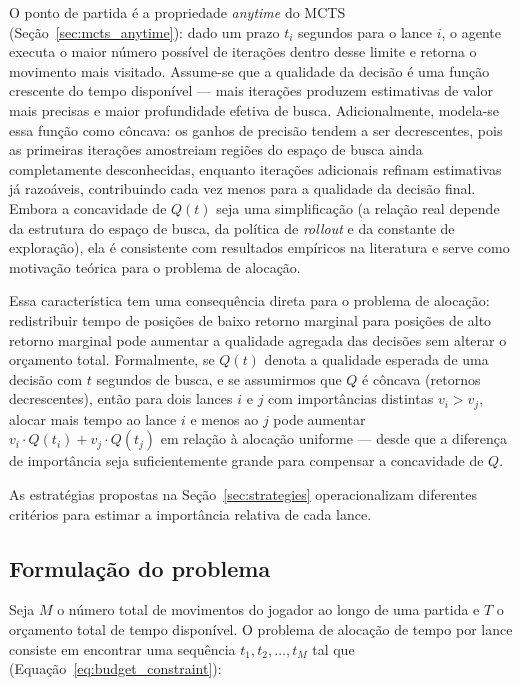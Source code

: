 \documentclass[cic,tc]{iiufrgs}
\begin{document}
O ponto de partida é a propriedade \emph{anytime} do MCTS (Seção~\ref{sec:mcts_anytime}): dado um prazo $t_i$ segundos para o lance $i$, o agente executa o maior número possível de iterações dentro desse limite e retorna o movimento mais visitado. Assume-se que a qualidade da decisão é uma função crescente do tempo disponível — mais iterações produzem estimativas de valor mais precisas e maior profundidade efetiva de busca. Adicionalmente, modela-se essa função como côncava: os ganhos de precisão tendem a ser decrescentes, pois as primeiras iterações amostreiam regiões do espaço de busca ainda completamente desconhecidas, enquanto iterações adicionais refinam estimativas já razoáveis, contribuindo cada vez menos para a qualidade da decisão final. Embora a concavidade de $Q(t)$ seja uma simplificação (a relação real depende da estrutura do espaço de busca, da política de \emph{rollout} e da constante de exploração), ela é consistente com resultados empíricos na literatura \cite{browne2012survey} e serve como motivação teórica para o problema de alocação.

Essa característica tem uma consequência direta para o problema de alocação: redistribuir tempo de posições de baixo retorno marginal para posições de alto retorno marginal pode aumentar a qualidade agregada das decisões sem alterar o orçamento total. Formalmente, se $Q(t)$ denota a qualidade esperada de uma decisão com $t$ segundos de busca, e se assumirmos que $Q$ é côncava (retornos decrescentes), então para dois lances $i$ e $j$ com importâncias distintas $v_i > v_j$, alocar mais tempo ao lance $i$ e menos ao $j$ pode aumentar $v_i \cdot Q(t_i) + v_j \cdot Q(t_j)$ em relação à alocação uniforme — desde que a diferença de importância seja suficientemente grande para compensar a concavidade de $Q$.

As estratégias propostas na Seção~\ref{sec:strategies} operacionalizam diferentes critérios para estimar a importância relativa de cada lance.

\subsection{Formulação do problema}
\label{sec:problem_formal}

Seja $M$ o número total de movimentos do jogador ao longo de uma partida e $T$ o orçamento total de tempo disponível. O problema de alocação de tempo por lance consiste em encontrar uma sequência $t_1, t_2, \ldots, t_M$ tal que (Equação~\ref{eq:budget_constraint}):
\end{document}
